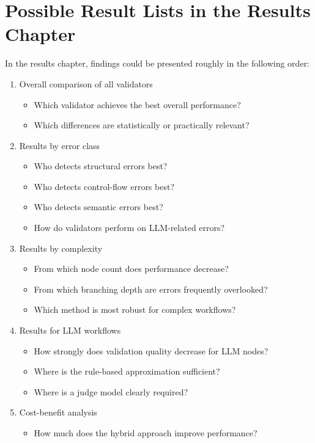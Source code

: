 \documentclass[12pt,a4paper]{article}
\begin{document}
\section{Possible Result Lists in the Results Chapter}

In the results chapter, findings could be presented roughly in the following order:

\begin{enumerate}
  \item Overall comparison of all validators
  \begin{itemize}
    \item Which validator achieves the best overall performance?
    \item Which differences are statistically or practically relevant?
  \end{itemize}
  \item Results by error class
  \begin{itemize}
    \item Who detects structural errors best?
    \item Who detects control-flow errors best?
    \item Who detects semantic errors best?
    \item How do validators perform on LLM-related errors?
  \end{itemize}
  \item Results by complexity
  \begin{itemize}
    \item From which node count does performance decrease?
    \item From which branching depth are errors frequently overlooked?
    \item Which method is most robust for complex workflows?
  \end{itemize}
  \item Results for LLM workflows
  \begin{itemize}
    \item How strongly does validation quality decrease for LLM nodes?
    \item Where is the rule-based approximation sufficient?
    \item Where is a judge model clearly required?
  \end{itemize}
  \item Cost-benefit analysis
  \begin{itemize}
    \item How much does the hybrid approach improve performance?

\end{itemize}
\end{enumerate}
\end{document}
